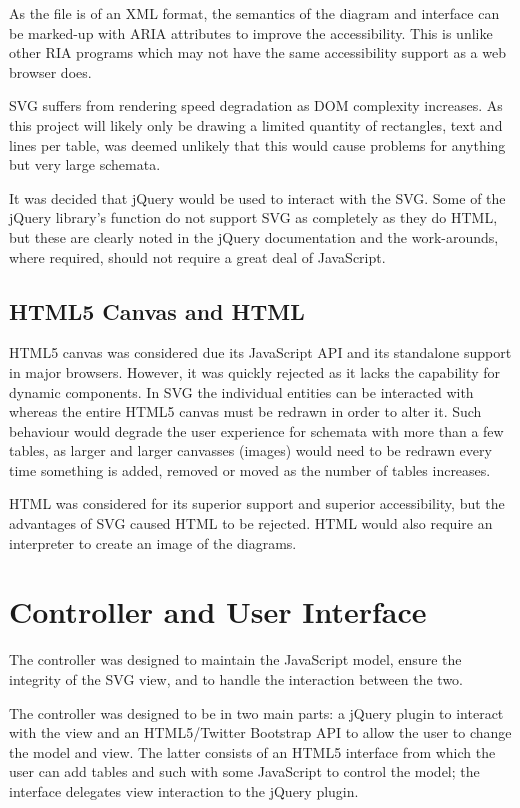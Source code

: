 As the file is of an XML format, the semantics of the diagram and interface can be marked-up with ARIA attributes to improve the accessibility. This is unlike other RIA programs which may not have the same accessibility support as a web browser does.

SVG suffers from rendering speed degradation as DOM complexity increases. As this project will likely only be drawing a limited quantity of rectangles, text and lines per table, was deemed unlikely that this would cause problems for anything but very large schemata.

It was decided that jQuery would be used to interact with the SVG. Some of the jQuery library's function do not support SVG as completely as they do HTML, but these are clearly noted in the jQuery documentation and the work-arounds, where required, should not require a great deal of Java\-Script.

\subsection{HTML5 Canvas and HTML}
HTML5 canvas was considered due its Java\-Script API and its standalone support in major browsers. However, it was quickly rejected as it lacks the capability for dynamic components. In SVG the individual entities can be interacted with whereas the entire HTML5 canvas must be redrawn in order to alter it. Such behaviour would degrade the user experience for schemata with more than a few tables, as larger and larger canvasses (images) would need to be redrawn every time something is added, removed or moved as the number of tables increases.

HTML was considered for its superior support and superior accessibility, but the advantages of SVG caused HTML to be rejected. HTML would also require an interpreter to create an image of the diagrams.

\section{Controller and User Interface}
The controller was designed to maintain the Java\-Script model, ensure the integrity of the SVG view, and to handle the interaction between the two.

The controller was designed to be in two main parts: a jQuery plugin to interact with the view and an HTML5\slash Twitter Bootstrap API to allow the user to change the model and view. The latter consists of an HTML5 interface from which the user can add tables and such with some Java\-Script to control the model; the interface delegates view interaction to the jQuery plugin.


